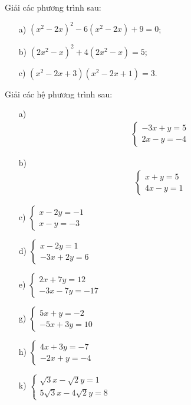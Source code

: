 \documentclass[%
    fontsize=12pt,%
    chapterprefix=false,%
    open=right,%
    twoside=false,%
    numbers=noenddot,%
    headings=optiontohead,%
    final,%
    DIV=15,%
    parskip=half %
]{scrbook}
\begin{document}
\begin{tuluan}
\item Giải các phương trình sau:
\begin{enumerate}[label=\alph*)]
  \item[a)] $(x^2 - 2x)^2 - 6(x^2 - 2x) + 9 = 0$;
  \item[b)] $(2x^2 - x)^2 + 4(2x^2 - x) = 5$;
  \item[c)] $(x^2 - 2x + 3)(x^2 - 2x + 1) = 3$.
\end{enumerate}

\item Giải các hệ phương trình sau:
\begin{enumerate}[label=\alph*)]
  \item[a)] \begin{align*} \begin{cases} -3x + y = 5 \\ 2x - y = -4 \end{cases} \end{align*}
  \item[b)] \begin{align*} \begin{cases} x + y = 5 \\ 4x - y = 1 \end{cases} \end{align*}
  \item[c)] $ \begin{cases} x - 2y = -1 \\ x - y = -3 \end{cases} $
  \item[d)] $ \begin{cases} x - 2y = 1 \\ -3x + 2y = 6 \end{cases} $
  \item[e)] $ \begin{cases} 2x + 7y = 12 \\ -3x - 7y = -17 \end{cases} $
  \item[g)] $ \begin{cases} 5x + y = -2 \\ -5x + 3y = 10 \end{cases} $
  \item[h)] $ \begin{cases} 4x + 3y = -7 \\ -2x + y = -4 \end{cases} $
  \item[k)] $ \begin{cases} \sqrt{3}x - \sqrt{2}y = 1 \\ 5\sqrt{3}x - 4\sqrt{2}y = 8 \end{cases} $
\end{enumerate}


\end{tuluan}
\end{document}

